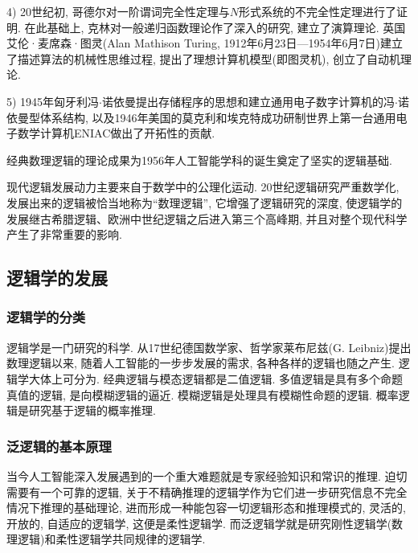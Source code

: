 4) 20世纪初, 哥德尔对一阶谓词完全性定理与$N$形式系统的不完全性定理进行了证明. 在此基础上, 克林对一般递归函数理论作了深入的研究, 建立了演算理论. 英国艾伦·麦席森·图灵(Alan Mathison Turing, 1912年6月23日—1954年6月7日)建立了描述算法的机械性思维过程, 提出了理想计算机模型(即图灵机), 创立了自动机理论.

5) 1945年匈牙利冯$\cdot$诺依曼提出存储程序的思想和建立通用电子数字计算机的冯$\cdot$诺依曼型体系结构, 以及1946年美国的莫克利和埃克特成功研制世界上第一台通用电子数学计算机ENIAC做出了开拓性的贡献.
\begin{remark}
经典数理逻辑的理论成果为1956年人工智能学科的诞生奠定了坚实的逻辑基础.

现代逻辑发展动力主要来自于数学中的公理化运动. 20世纪逻辑研究严重数学化, 发展出来的逻辑被恰当地称为“数理逻辑”, 它增强了逻辑研究的深度, 使逻辑学的发展继古希腊逻辑、欧洲中世纪逻辑之后进入第三个高峰期, 并且对整个现代科学产生了非常重要的影响.
\end{remark}

\subsection{逻辑学的发展}
\subsubsection{逻辑学的分类}

逻辑学是一门研究的科学.  从17世纪德国数学家、哲学家莱布尼兹(G. Leibniz)提出数理逻辑以来, 随着人工智能的一步步发展的需求, 各种各样的逻辑也随之产生. 逻辑学大体上可分为. 经典逻辑与模态逻辑都是二值逻辑. 多值逻辑是具有多个命题真值的逻辑, 是向模糊逻辑的逼近. 模糊逻辑是处理具有模糊性命题的逻辑. 概率逻辑是研究基于逻辑的概率推理.
\subsubsection{泛逻辑的基本原理}

当今人工智能深入发展遇到的一个重大难题就是专家经验知识和常识的推理. 迫切需要有一个可靠的逻辑, 关于不精确推理的逻辑学作为它们进一步研究信息不完全情况下推理的基础理论, 进而形成一种能包容一切逻辑形态和推理模式的, 灵活的, 开放的, 自适应的逻辑学, 这便是柔性逻辑学. 而泛逻辑学就是研究刚性逻辑学(数理逻辑)和柔性逻辑学共同规律的逻辑学.

